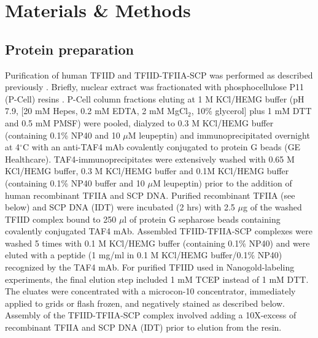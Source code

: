 
\chapter{Materials \& Methods}

\section{Protein preparation}
Purification of human TFIID and TFIID-TFIIA-SCP was performed as described previously \cite{Grob_1281,Liu_574}. Briefly, nuclear extract was fractionated with phosphocellulose P11 (P-Cell) resins \cite{Andel_2407,Naar_2527}.  P-Cell column fractions eluting at 1 M KCl/HEMG buffer (pH 7.9, [20 mM Hepes, 0.2 mM EDTA, 2 mM MgCl$_{2}$, 10\% glycerol] plus 1 mM DTT and 0.5 mM PMSF) were pooled, dialyzed to 0.3 M KCl/HEMG buffer (containing 0.1\% NP40 and 10 $\mu$M leupeptin) and immunoprecipitated overnight at 4$^{\circ}$C with an anti-TAF4 mAb covalently conjugated to protein G beads (GE Healthcare).  TAF4-immunoprecipitates were extensively washed with 0.65 M KCl/HEMG buffer, 0.3 M KCl/HEMG buffer and 0.1M KCl/HEMG buffer (containing 0.1\% NP40 buffer and 10 $\mu$M leupeptin) prior to the addition of human recombinant TFIIA and SCP DNA.  Purified recombinant TFIIA (see below) and SCP DNA (IDT) were incubated (2 hrs) with 2.5 $\mu$g of the washed TFIID complex bound to 250 $\mu$l of protein G sepharose beads containing covalently conjugated TAF4 mAb.  Assembled TFIID-TFIIA-SCP complexes were washed 5 times with 0.1 M KCl/HEMG buffer (containing 0.1\% NP40) and were eluted with a peptide (1 mg/ml in 0.1 M KCl/HEMG buffer/0.1\% NP40) recognized by the TAF4 mAb.  For purified TFIID used in Nanogold-labeling experiments, the final elution step included 1 mM TCEP instead of 1 mM DTT.  The eluates were concentrated with a microcon-10 concentrator, immediately applied to grids or flash frozen, and negatively stained as described below. Assembly of the TFIID-TFIIA-SCP complex involved adding a 10X-excess of recombinant TFIIA \cite{Sun_3221} and SCP DNA (IDT) prior to elution from the resin. \\
